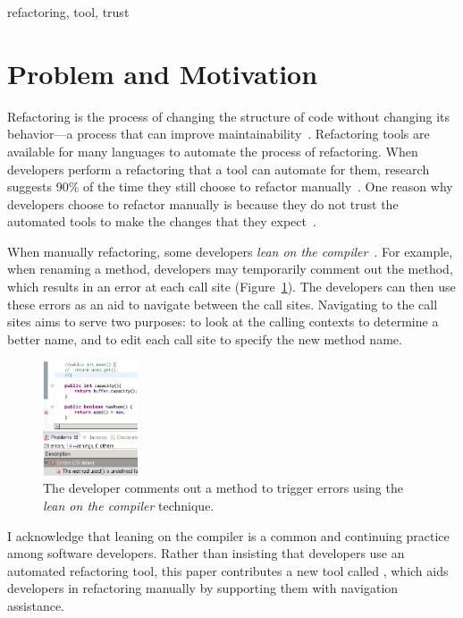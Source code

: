 \documentclass{sigplanconf}
\begin{document}

\keywords
refactoring, tool, trust


\section{Problem and Motivation}
Refactoring is the process of changing the structure of code without changing
its behavior---a process that can improve
maintainability~\cite{maintainability}.
Refactoring tools are available for many languages to automate the process of
refactoring. When developers perform a refactoring that a tool can automate for
them, research suggests 90\% of the time they still choose to refactor
manually~\cite{how-refactor}. One reason why developers choose to refactor
manually is because they do not trust the automated tools to make the changes
that they expect~\cite{how-refactor, say-refactor}. 

When manually refactoring, some developers
\textit{lean on the compiler}~\cite{legacy-code, how-refactor}.
For example, when renaming a method, developers may temporarily comment
out the method, which results
in an error at each call site (Figure~\ref{comment}). The developers can then
use these errors as an aid to navigate between the call sites.
Navigating to the call sites aims to serve two purposes: to look at the calling
contexts to determine a better name, and to edit each call site to specify
the new method name.

\begin{figure}[h]
\begin{center}
\includegraphics[width=0.25\textwidth]{comment.png}
\caption{The developer comments out a method to trigger errors using the
\textit{lean on the compiler} technique.\label{comment}}
\end{center}
\end{figure}

I acknowledge that leaning on the compiler is a common and continuing practice
among software developers. Rather than insisting that developers use an
automated refactoring tool, this paper contributes a new tool
called \pname{}, which aids developers in refactoring
manually by supporting them with navigation assistance.
\end{document}
